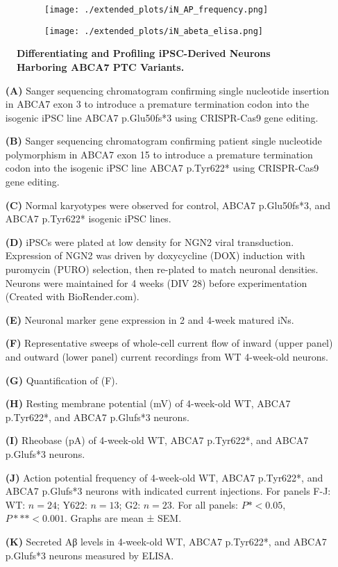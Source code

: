 \begin{figure}[H]
\begin{subfigure}[t]{0.25\textwidth}
    \end{subfigure} 
    \hspace{1cm}
    \begin{subfigure}[t]{0.3\textwidth}
        \caption{}
        \texttt{[image: ./extended\_plots/iN\_AP\_frequency.png]}        
    \end{subfigure}  
    \hspace{1cm}
    \begin{subfigure}[t]{0.35\textwidth}
        \caption{}
        \texttt{[image: ./extended\_plots/iN\_abeta\_elisa.png]}        
    \end{subfigure}  
    \caption{
        \textbf{Differentiating and Profiling iPSC-Derived Neurons Harboring ABCA7 PTC Variants.}\\
    }
    \label{fig:differentiating_iPSC_neurons}
\end{figure}
\begin{itemize}
    \item[\textbf{(A)}] Sanger sequencing chromatogram confirming single nucleotide insertion in ABCA7 exon 3 to introduce a premature termination codon into the isogenic iPSC line ABCA7 p.Glu50fs*3 using CRISPR-Cas9 gene editing. 
    \item[\textbf{(B)}] Sanger sequencing chromatogram confirming patient single nucleotide polymorphism in ABCA7 exon 15 to introduce a premature termination codon into the isogenic iPSC line ABCA7 p.Tyr622* using CRISPR-Cas9 gene editing. 
    \item[\textbf{(C)}] Normal karyotypes were observed for control, ABCA7 p.Glu50fs*3, and ABCA7 p.Tyr622* isogenic iPSC lines. 
    \item[\textbf{(D)}] iPSCs were plated at low density for NGN2 viral transduction. Expression of NGN2 was driven by doxycycline (DOX) induction with puromycin (PURO) selection, then re-plated to match neuronal densities. Neurons were maintained for 4 weeks (DIV 28) before experimentation (Created with BioRender.com). 
    \item[\textbf{(E)}] Neuronal marker gene expression in 2 and 4-week matured iNs. 
    \item[\textbf{(F)}] Representative sweeps of whole-cell current flow of inward (upper panel) and outward (lower panel) current recordings from WT 4-week-old neurons. 
    \item[\textbf{(G)}] Quantification of (F). 
    \item[\textbf{(H)}] Resting membrane potential (mV) of 4-week-old WT, ABCA7 p.Tyr622*, and ABCA7 p.Glufs*3 neurons. 
    \item[\textbf{(I)}] Rheobase (pA) of 4-week-old WT, ABCA7 p.Tyr622*, and ABCA7 p.Glufs*3 neurons. 
    \item[\textbf{(J)}] Action potential frequency of 4-week-old WT, ABCA7 p.Tyr622*, and ABCA7 p.Glufs*3 neurons with indicated current injections. For panels F-J: WT: $n=24$; Y622: $n=13$; G2: $n=23$. For all panels: $P*<0.05$, $P***<0.001$. Graphs are mean ± SEM.
    \item[\textbf{(K)}] Secreted Aβ levels in 4-week-old WT, ABCA7 p.Tyr622*, and ABCA7 p.Glufs*3 neurons measured by ELISA. 
\end{itemize}